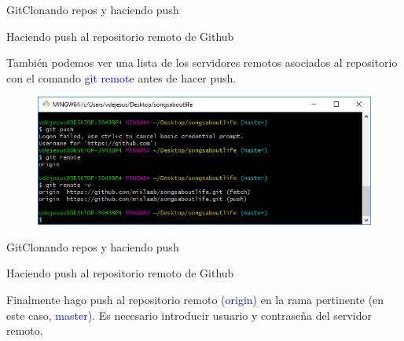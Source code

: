 \documentclass[10pt]{beamer}
\begin{document}
\begin{frame}{Git}{Clonando repos y haciendo push}

\begin{block}{Haciendo push al repositorio remoto de Github}

También podemos ver una lista de los servidores remotos asociados al repositorio con el comando \textcolor{blue}{git remote} antes de hacer push.

\begin{figure}[h!]
\centering
\includegraphics [scale=0.55]{gitremote}
\label{fig:gitlog}
\end{figure}

\end{block}

\end{frame}

\begin{frame}{Git}{Clonando repos y haciendo push}

\begin{block}{Haciendo push al repositorio remoto de Github}

Finalmente hago push al repositorio remoto (\textcolor{blue}{origin}) en la rama pertinente (en este caso, \textcolor{blue}{master}). Es necesario introducir usuario y contraseña del servidor remoto.
\medskip
\begin{columns}[c]
\column{2.5in}
\column{1in}
\end{columns}


\end{block}

\end{frame}
\end{document}
